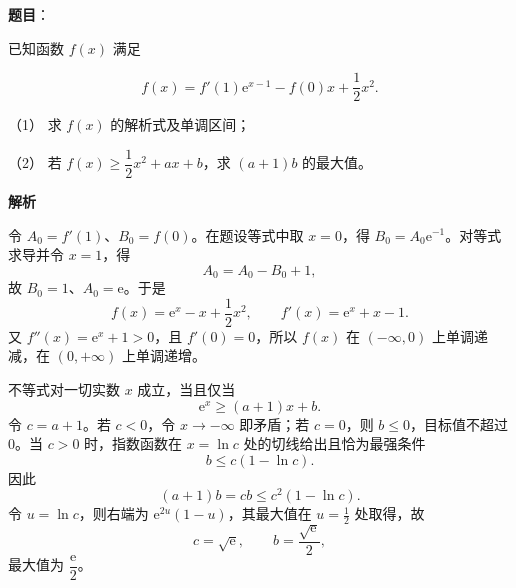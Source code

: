 \begin{answer}

\textbf{题目}：

已知函数 $f(x)$ 满足

\nopagebreak[4]
\[
f(x)=f'(1)\mathrm e^{x-1}-f(0)x+\frac12x^2.
\]

（1） 求 $f(x)$ 的解析式及单调区间；

（2） 若 $f(x)\geqslant\dfrac12x^2+ax+b$，求 $(a+1)b$ 的最大值。

\textbf{解析}


令 $A_0=f'(1)$、$B_0=f(0)$。在题设等式中取 $x=0$，得 $B_0=A_0\mathrm e^{-1}$。对等式求导并令 $x=1$，得
\nopagebreak[4]
\[
A_0=A_0-B_0+1,
\]
故 $B_0=1$、$A_0=\mathrm e$。于是
\nopagebreak[4]
\[
f(x)=\mathrm e^x-x+\frac12x^2,
\qquad
f'(x)=\mathrm e^x+x-1.
\]
又 $f''(x)=\mathrm e^x+1>0$，且 $f'(0)=0$，所以 $f(x)$ 在 $(-\infty,0)$ 上单调递减，在 $(0,+\infty)$ 上单调递增。


不等式对一切实数 $x$ 成立，当且仅当
\nopagebreak[4]
\[
\mathrm e^x\geqslant (a+1)x+b.
\]
令 $c=a+1$。若 $c<0$，令 $x\to-\infty$ 即矛盾；若 $c=0$，则 $b\leqslant0$，目标值不超过 $0$。当 $c>0$ 时，指数函数在 $x=\ln c$ 处的切线给出且恰为最强条件
\nopagebreak[4]
\[
b\leqslant c(1-\ln c).
\]
因此
\nopagebreak[4]
\[
(a+1)b=cb\leqslant c^2(1-\ln c).
\]
令 $u=\ln c$，则右端为 $\mathrm e^{2u}(1-u)$，其最大值在 $u=\frac12$ 处取得，故
\nopagebreak[4]
\[
c=\sqrt{\mathrm e},\qquad b=\frac{\sqrt{\mathrm e}}2,
\]
最大值为 $\dfrac{\mathrm e}{2}$。



\end{answer}
